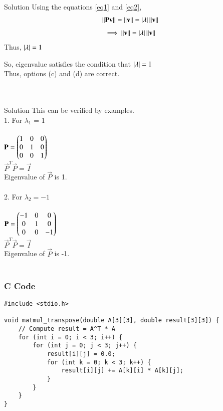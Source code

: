 \documentclass{beamer}
\begin{document}
\begin{frame}{Solution}
Using the equations \eqref{eq1} and \eqref{eq2},
\begin{align}
\left\lVert\mathbf{P}\mathbf{v}\right\rVert = \left\lVert\mathbf{v}\right\rVert = \left\vert\lambda\right\vert\left\lVert\mathbf{v}\right\rVert
\end{align}
\begin{align}
\implies \left\lVert\mathbf{v}\right\rVert = \left\vert\lambda\right\vert\left\lVert\mathbf{v}\right\rVert
\end{align}
Thus, $\left\vert\lambda\right\vert = 1$

So, eigenvalue satisfies the condition that $\left\vert\lambda\right\vert=1$\\


Thus, options (c) and (d) are correct. \\ \\ \\
\end{frame}

\begin{frame}{Solution}
This can be verified by examples.\\ 
1. For $\lambda_1$ = 1 \\ \\
$\mathbf{P} = \begin{pmatrix}1 & 0 & 0 \\ 0 & 1 & 0 \\ 0 & 0 & 1\end{pmatrix}$ \\
$\vec{P}^T\vec{P} = \vec{I}$ \\
Eigenvalue of $\vec{P}$ is 1. \\ \\
2. For $\lambda_2 = -1$ \\ \\
$\mathbf{P} = \begin{pmatrix}-1 & 0 & 0 \\ 0 & 1 & 0 \\ 0 & 0 & -1\end{pmatrix}$ \\
$\vec{P}^T\vec{P} = \vec{I}$ \\
Eigenvalue of $\vec{P}$ is -1. \\ \\
\end{frame}

\begin{frame}[fragile]
    \frametitle{C Code}
    \begin{lstlisting}
#include <stdio.h>

void matmul_transpose(double A[3][3], double result[3][3]) {
    // Compute result = A^T * A
    for (int i = 0; i < 3; i++) {
        for (int j = 0; j < 3; j++) {
            result[i][j] = 0.0;
            for (int k = 0; k < 3; k++) {
                result[i][j] += A[k][i] * A[k][j];
            }
        }
    }
}




    \end{lstlisting}
\end{frame}
\end{document}
